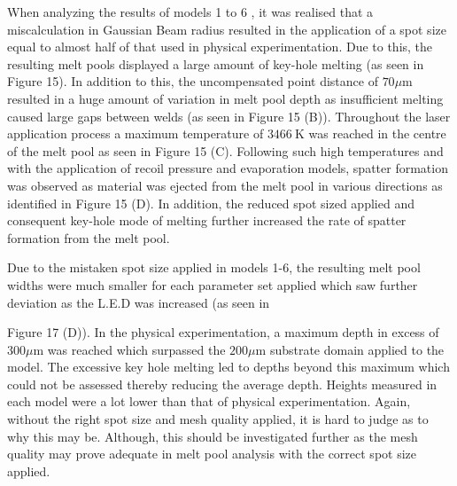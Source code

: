 \documentclass[10pt]{article}
\begin{document}
When analyzing the results of models 1 to 6 , it was realised that a miscalculation in Gaussian Beam radius resulted in the application of a spot size equal to almost half of that used in physical experimentation. Due to this, the resulting melt pools displayed a large amount of key-hole melting (as seen in Figure 15). In addition to this, the uncompensated point distance of $70 \mu \mathrm{m}$ resulted in a huge amount of variation in melt pool depth as insufficient melting caused large gaps between welds (as seen in Figure 15 (B)). Throughout the laser application process a maximum temperature of $3466 \mathrm{~K}$ was reached in the centre of the melt pool as seen in Figure 15 (C). Following such high temperatures and with the application of recoil pressure and evaporation models, spatter formation was observed as material was ejected from the melt pool in various directions as identified in Figure 15 (D). In addition, the reduced spot sized applied and consequent key-hole mode of melting further increased the rate of spatter formation from the melt pool.

Due to the mistaken spot size applied in models 1-6, the resulting melt pool widths were much smaller for each parameter set applied which saw further deviation as the L.E.D was increased (as seen in

Figure 17 (D)). In the physical experimentation, a maximum depth in excess of $300 \mu \mathrm{m}$ was reached which surpassed the $200 \mu \mathrm{m}$ substrate domain applied to the model. The excessive key hole melting led to depths beyond this maximum which could not be assessed thereby reducing the average depth. Heights measured in each model were a lot lower than that of physical experimentation. Again, without the right spot size and mesh quality applied, it is hard to judge as to why this may be. Although, this should be investigated further as the mesh quality may prove adequate in melt pool analysis with the correct spot size applied.
\end{document}
